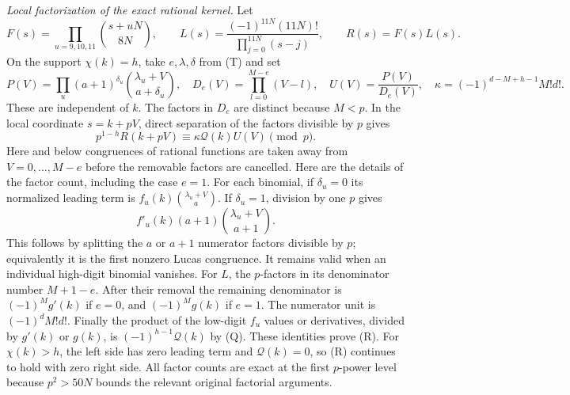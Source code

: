 \documentclass[11pt]{article}
\begin{document}
\emph{Local factorization of the exact rational kernel.}
Let
\[
 F(s)=\prod_{u=9,10,11}\binom{s+uN}{8N},\qquad
 L(s)=\frac{(-1)^{11N}(11N)!}{\prod_{j=0}^{11N}(s-j)},\qquad
 R(s)=F(s)L(s).
\]
On the support $\chi(k)=h$, take $e,\lambda,\delta$ from (T) and set
\[
 P(V)=\prod_u (a+1)^{\delta_u}
                   \binom{\lambda_u+V}{a+\delta_u},\quad
 D_e(V)=\prod_{l=0}^{M-e}(V-l),\quad
 U(V)=\frac{P(V)}{D_e(V)},\quad
 \kappa=(-1)^{d-M+h-1}M!d!.
\]
These are independent of $k$. The factors in $D_e$ are distinct because
$M<p$. In the local coordinate $s=k+pV$, direct separation of the
factors divisible by $p$ gives
\[
 p^{1-h}R(k+pV)\equiv\kappa \mathcal Q(k)U(V)\pmod p.
 \tag{R}
\]
Here and below congruences of rational functions are taken away from
$V=0,\ldots,M-e$ before the removable factors are cancelled.
Here are the details of the factor count, including the case $e=1$.
For each binomial, if $\delta_u=0$ its normalized leading term is
$f_u(k)\binom{\lambda_u+V}{a}$.
If $\delta_u=1$, division by one $p$ gives
\[
 f'_u(k)(a+1)\binom{\lambda_u+V}{a+1}.
\]
This follows by splitting the $a$ or $a+1$ numerator factors divisible
by $p$; equivalently it is the first nonzero Lucas congruence.
It remains valid when an individual high-digit binomial vanishes.
For $L$, the $p$-factors in its denominator number $M+1-e$.
After their removal the remaining denominator is
$(-1)^M g'(k)$ if $e=0$, and $(-1)^M g(k)$ if $e=1$.
The numerator unit is $(-1)^dM!d!$.
Finally the product of the low-digit $f_u$ values or derivatives,
divided by $g'(k)$ or $g(k)$, is $(-1)^{h-1}\mathcal Q(k)$ by (Q).
These identities prove (R). For $\chi(k)>h$, the left side has zero
leading term and $\mathcal Q(k)=0$, so (R) continues to hold with zero right
side. All factor counts are exact at the first $p$-power level because
$p^2>50N$ bounds the relevant original factorial arguments.
\end{document}
